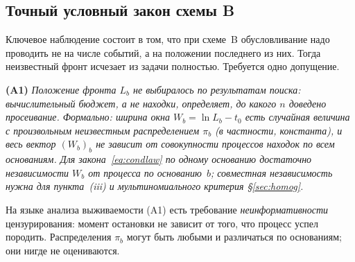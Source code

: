 \documentclass[11pt,a4paper]{article}
\theoremstyle{plain}
\theoremstyle{remark}
\begin{document}
\subsection{Точный условный закон схемы B}\label{sec:exact}

Ключевое наблюдение состоит в том, что при схеме~B обусловливание надо проводить
не на числе событий, а на положении последнего из них. Тогда неизвестный фронт
исчезает из задачи полностью. Требуется одно допущение.

\medskip
\noindent\textbf{(A1)} \emph{Положение фронта $L_b$ не выбиралось по результатам поиска:
вычислительный бюджет, а не находки, определяет, до какого $n$ доведено просеивание.
Формально: ширина окна $W_b=\ln L_b-t_0$ есть случайная величина с произвольным
неизвестным распределением $\pi_b$ (в частности, константа), и весь вектор
$(W_b)_b$ не зависит от совокупности процессов находок по всем основаниям. Для
закона~\eqref{eq:condlaw} по одному основанию достаточно независимости $W_b$ от
процесса по основанию~$b$; совместная независимость нужна для
пункта~(iii) и мультиномиального критерия \S\ref{sec:homog}.}

\medskip
\noindent На языке анализа выживаемости (A1) есть требование
\emph{неинформативности} цензурирования: момент остановки не зависит от того,
что процесс успел породить. Распределения $\pi_b$ могут быть любыми и различаться
по основаниям; они нигде не оцениваются.
\end{document}
